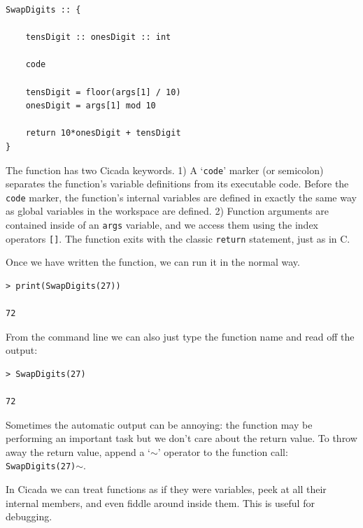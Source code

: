 \documentclass{article}
\newenvironment{code}{
       \begin{list}{}{
               \setlength{\leftmargin}{.4in}
               \setlength{\rightmargin}{0in}
               \setlength{\topsep}{.2in}
       }
       \small
       \item[] }
       { \end{list}   }
\begin{document}
\begin{code} \begin{verbatim}
SwapDigits :: {
    
    tensDigit :: onesDigit :: int
    
    code
    
    tensDigit = floor(args[1] / 10)
    onesDigit = args[1] mod 10
    
    return 10*onesDigit + tensDigit
}
\end{verbatim} \end{code}

\noindent The function has two Cicada keywords.  1) A `\texttt{code}' marker (or semicolon) separates the function's variable definitions from its executable code.  Before the \verb#code# marker, the function's internal variables are defined in exactly the same way as global variables in the workspace are defined.  2) Function arguments are contained inside of an \texttt{args} variable, and we access them using the index operators \verb#[]#.  The function exits with the classic \texttt{return} statement, just as in C.

Once we have written the function, we can run it in the normal way.

\begin{code} \begin{verbatim}
> print(SwapDigits(27))

72
\end{verbatim} \end{code}

\noindent From the command line we can also just type the function name and read off the output:

\begin{code} \begin{verbatim}
> SwapDigits(27)

72
\end{verbatim} \end{code}

\noindent Sometimes the automatic output can be annoying:  the function may be performing an important task but we don't care about the return value.  To throw away the return value, append a `$\sim$' operator to the function call:  \texttt{SwapDigits(27)}$\sim$.

In Cicada we can treat functions as if they were variables, peek at all their internal members, and even fiddle around inside them.  This is useful for debugging.
\end{document}
